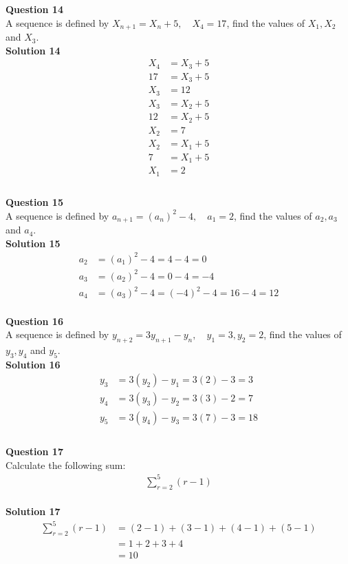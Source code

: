 \documentclass{article}
\begin{document}
\noindent\textbf{Question 14}\\[5pt]
A sequence is defined by $X_{n+1}=X_n+5, \quad X_4=17$, find the values of $X_1,X_2$ and $X_3$.\\[5pt]
\noindent\textbf{Solution 14}\\[5pt]
\begin{align*}
X_4&=X_3+5\\[2pt]
17&=X_3+5\\[2pt]
X_3&=12\\[12pt]
X_3&=X_2+5\\[2pt]
12&=X_2+5\\[2pt]
X_2&=7\\[12pt]
X_2&=X_1+5\\[2pt]
7&=X_1+5\\[2pt]
X_1&=2\\[12pt]
\end{align*}\\[10pt]

\noindent\textbf{Question 15}\\[5pt]
A sequence is defined by $a_{n+1}=(a_n)^2-4, \quad a_1=2$, find the values of $a_2,a_3$ and $a_4$.\\[5pt]
\noindent\textbf{Solution 15}\\[5pt]
\begin{align*}
a_2&=(a_1)^2-4=4-4=0\\[2pt]
a_3&=(a_2)^2-4=0-4=-4\\[2pt]
a_4&=(a_3)^2-4=(-4)^2-4=16-4=12
\end{align*}\\[10pt]

\noindent\textbf{Question 16}\\[5pt]
A sequence is defined by $y_{n+2}=3y_{n+1}-y_n, \quad y_1=3,y_2=2$, find the values of $y_3,y_4$ and $y_5$.\\[5pt]
\noindent\textbf{Solution 16}\\[5pt]
\begin{align*}
y_3&=3(y_2)-y_1=3(2)-3=3\\[2pt]
y_4&=3(y_3)-y_2=3(3)-2=7\\[2pt]
y_5&=3(y_4)-y_3=3(7)-3=18\\[-30pt]
\end{align*}\\[10pt]

\noindent\textbf{Question 17}\\[5pt]
Calculate the following sum:
\begin{align*}
\sum_{r=2}^{5} (r-1)
\end{align*}\\[5pt]
\noindent\textbf{Solution 17}\\[5pt]
\begin{align*}
\sum_{r=2}^{5} (r-1)&=(2-1)+(3-1)+(4-1)+(5-1)\\[2pt]
&=1+2+3+4\\[2pt]
&=10
\end{align*}\\[10pt]
\end{document}
